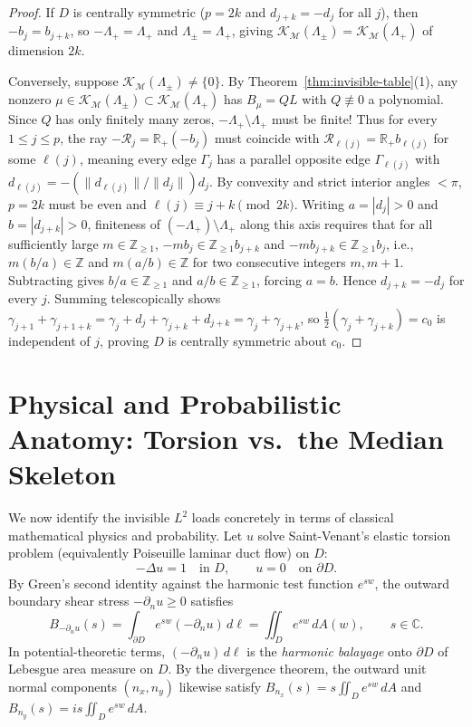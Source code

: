 \documentclass[11pt,reqno]{amsart}
\theoremstyle{definition}
\theoremstyle{remark}
\newcommand{\C}{\mathbb{C}}
\newcommand{\R}{\mathbb{R}}
\newcommand{\Z}{\mathbb{Z}}
\begin{document}
\begin{proof}
If $D$ is centrally symmetric ($p = 2k$ and $d_{j+k} = -d_j$ for all $j$), then $-b_j = b_{j+k}$, so $-\Lambda_+ = \Lambda_+$ and $\Lambda_\pm = \Lambda_+$, giving $\mathcal{K}_{\mathcal{M}}(\Lambda_\pm) = \mathcal{K}_{\mathcal{M}}(\Lambda_+)$ of dimension $2k$.

Conversely, suppose $\mathcal{K}_{\mathcal{M}}(\Lambda_\pm) \ne \{0\}$. By Theorem~\ref{thm:invisible-table}(1), any nonzero $\mu \in \mathcal{K}_{\mathcal{M}}(\Lambda_\pm) \subset \mathcal{K}_{\mathcal{M}}(\Lambda_+)$ has $B_\mu = Q L$ with $Q \not\equiv 0$ a polynomial. Since $Q$ has only finitely many zeros, $-\Lambda_+ \setminus \Lambda_+$ must be finite! Thus for every $1 \le j \le p$, the ray $-\mathcal{R}_j = \R_+(-b_j)$ must coincide with $\mathcal{R}_{\ell(j)} = \R_+ b_{\ell(j)}$ for some $\ell(j)$, meaning every edge $\Gamma_j$ has a parallel opposite edge $\Gamma_{\ell(j)}$ with $d_{\ell(j)} = -(\|d_{\ell(j)}\|/\|d_j\|) d_j$. By convexity and strict interior angles $< \pi$, $p = 2k$ must be even and $\ell(j) \equiv j + k \pmod{2k}$. Writing $a = |d_j| > 0$ and $b = |d_{j+k}| > 0$, finiteness of $(-\Lambda_+) \setminus \Lambda_+$ along this axis requires that for all sufficiently large $m \in \Z_{\ge 1}$, $-m b_j \in \Z_{\ge 1} b_{j+k}$ and $-m b_{j+k} \in \Z_{\ge 1} b_j$, i.e., $m(b/a) \in \Z$ and $m(a/b) \in \Z$ for two consecutive integers $m, m+1$. Subtracting gives $b/a \in \Z_{\ge 1}$ and $a/b \in \Z_{\ge 1}$, forcing $a = b$. Hence $d_{j+k} = -d_j$ for every $j$. Summing telescopically shows $\gamma_{j+1} + \gamma_{j+1+k} = \gamma_j + d_j + \gamma_{j+k} + d_{j+k} = \gamma_j + \gamma_{j+k}$, so $\frac12(\gamma_j + \gamma_{j+k}) = c_0$ is independent of $j$, proving $D$ is centrally symmetric about $c_0$.
\end{proof}

\section{Physical and Probabilistic Anatomy: Torsion vs.\ the Median Skeleton}\label{sec:anatomy}

We now identify the invisible $L^2$ loads concretely in terms of classical mathematical physics and probability. Let $u$ solve Saint-Venant's elastic torsion problem (equivalently Poiseuille laminar duct flow) on $D$:
\begin{equation}\label{eq:torsion-pde}
  -\Delta u = 1 \quad \text{in } D, \qquad u = 0 \quad \text{on } \partial D.
\end{equation}
By Green's second identity against the harmonic test function $e^{sw}$, the outward boundary shear stress $-\partial_n u \ge 0$ satisfies
\begin{equation}\label{eq:balayage-area}
  B_{-\partial_n u}(s) = \int_{\partial D} e^{sw}(-\partial_n u)\,d\ell = \iint_D e^{sw}\,dA(w), \qquad s \in \C.
\end{equation}
In potential-theoretic terms, $(-\partial_n u)\,d\ell$ is the \emph{harmonic balayage} onto $\partial D$ of Lebesgue area measure on $D$. By the divergence theorem, the outward unit normal components $(n_x, n_y)$ likewise satisfy $B_{n_x}(s) = s \iint_D e^{sw}\,dA$ and $B_{n_y}(s) = i s \iint_D e^{sw}\,dA$.
\end{document}
